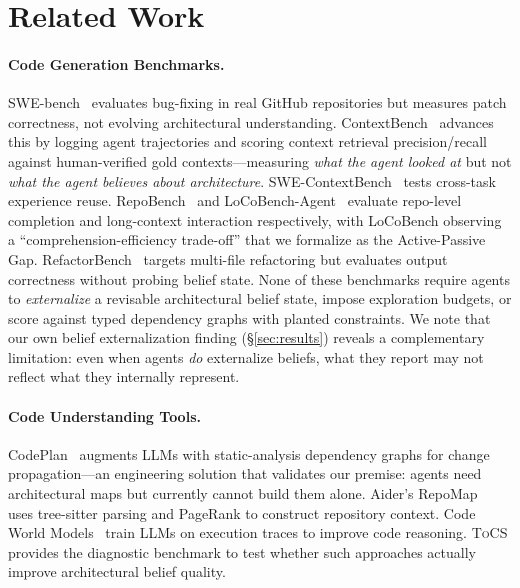 \documentclass{article}
\newcommand{\tocs}{\textsc{ToCS}}
\begin{document}
\section{Related Work}
\label{sec:related}

\paragraph{Code Generation Benchmarks.}
SWE-bench~\citep{jimenez2024swebench} evaluates bug-fixing in real GitHub repositories but measures patch correctness, not evolving architectural understanding. ContextBench~\citep{li2026contextbench} advances this by logging agent trajectories and scoring context retrieval precision/recall against human-verified gold contexts---measuring \emph{what the agent looked at} but not \emph{what the agent believes about architecture}. SWE-ContextBench~\citep{zhu2026swecontextbench} tests cross-task experience reuse. RepoBench~\citep{liu2024repobench} and LoCoBench-Agent~\citep{qiu2025locobench} evaluate repo-level completion and long-context interaction respectively, with LoCoBench observing a ``comprehension-efficiency trade-off'' that we formalize as the Active-Passive Gap. RefactorBench~\citep{masai2025refactorbench} targets multi-file refactoring but evaluates output correctness without probing belief state. None of these benchmarks require agents to \emph{externalize} a revisable architectural belief state, impose exploration budgets, or score against typed dependency graphs with planted constraints. We note that our own belief externalization finding (\S\ref{sec:results}) reveals a complementary limitation: even when agents \emph{do} externalize beliefs, what they report may not reflect what they internally represent.

\paragraph{Code Understanding Tools.}
CodePlan~\citep{bairi2024codeplan} augments LLMs with static-analysis dependency graphs for change propagation---an engineering solution that validates our premise: agents need architectural maps but currently cannot build them alone. Aider's RepoMap~\citep{gauthier2024aider} uses tree-sitter parsing and PageRank to construct repository context. Code World Models~\citep{fair2025cwm} train LLMs on execution traces to improve code reasoning. \tocs{} provides the diagnostic benchmark to test whether such approaches actually improve architectural belief quality.
\end{document}
